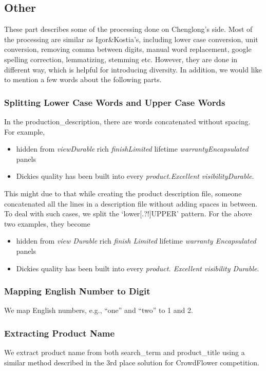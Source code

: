 \documentclass[12pt]{article}
\begin{document}
{{\subsection{Other}
These part describes some of the processing done on Chenglong's side. Most of the processing are similar as Igor\&Kostia's, including lower case conversion, unit conversion, removing comma between digits, manual word replacement, google spelling correction, lemmatizing, stemming etc. However, they are done in different way, which is helpful for introducing diversity. In addition, we would like to mention a few words about the following parts.
\subsubsection{Splitting Lower Case Words and Upper Case Words}
In the production\_description, there are words concatenated without spacing. For example,
\begin{itemize}
\item hidden from \emph{viewDurable} rich \emph{finishLimited} lifetime \emph{warrantyEncapsulated} panels
\item Dickies quality has been built into every \emph{product.Excellent} \emph{visibilityDurable}.
\end{itemize}
This might due to that while creating the product description file, someone concatenated all the lines in a description file without adding spaces in between. To deal with such cases, we split the `lower[.?!]UPPER' pattern. For the above two examples, they become
\begin{itemize}
\item hidden from \emph{view Durable} rich \emph{finish Limited} lifetime \emph{warranty Encapsulated} panels
\item Dickies quality has been built into every \emph{product. Excellent} \emph{visibility Durable}.
\end{itemize}

\subsubsection{Mapping English Number to Digit}
We map English numbers, e.g., ``one'' and ``two'' to 1 and 2.

\subsubsection{Extracting Product Name}
We extract product name from both search\_term and product\_title using a similar method described in the 3rd place solution for CrowdFlower competition\cite{crowdflower_3place}.

}}
\end{document}
